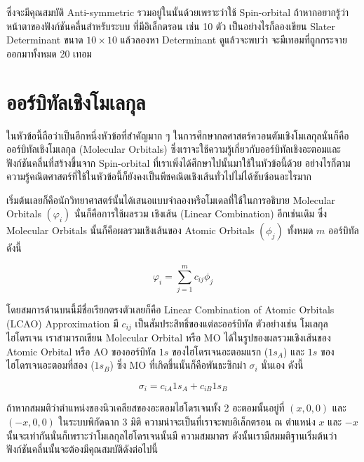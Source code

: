 \noindent ซึ่งจะมีคุณสมบัติ Anti-symmetric รวมอยู่ในนั้นด้วยเพราะว่าใช้ Spin-orbital ถ้าหากอยากรู้ว่าหน้าตาของฟังก์ชันคลื่นสำหรับระบบ%
ที่มีอิเล็กตรอน เช่น 10 ตัว เป็นอย่างไรก็ลองเขียน Slater Determinant ขนาด $10 \times 10$ แล้วลองหา Determinant ดูแล้วจะพบว่า%
จะมีเทอมที่ถูกกระจายออกมาทั้งหมด 20 เทอม

\section{ออร์บิทัลเชิงโมเลกุล}

ในหัวข้อนี้ถือว่าเป็นอีกหนึ่งหัวข้อที่สำคัญมาก ๆ ในการศึกษากลศาสตร์ควอนตัมเชิงโมเลกุลนั่นก็คือออร์บิทัลเชิงโมเลกุล (Molecular Orbitals) 
ซึ่งเราจะใช้ความรู้เกี่ยวกับออร์บิทัลเชิงอะตอมและฟังก์ชันคลื่นที่สร้างขึ้นจาก Spin-orbital ที่เราเพิ่งได้ศึกษาไปนั้นมาใช้ในหัวข้อนี้ด้วย 
อย่างไรก็ตาม ความรู้คณิตศาสตร์ที่ใช้ในหัวข้อนี้ก็ยังคงเป็นพีชคณิตเชิงเส้นทั่วไปไม่ได้ซับซ้อนอะไรมาก 

เริ่มต้นเลยก็คือนักวิทยาศาสตร์นั้นได้เสนอแบบจำลองหรือโมเดลที่ใช้ในการอธิบาย Molecular Orbitals $(\varphi_i)$ นั่นก็คือการใช้ผลรวม%
เชิงเส้น (Linear Combination) อีกเช่นเดิม ซึ่ง Molecular Orbitals นั้นก็คือผลรวมเชิงเส้นของ Atomic Orbitals $(\phi_j)$ ทั้งหมด 
$m$ ออร์บิทัล ดังนี้

\begin{equation}
    \label{eq:LCAO}
    \varphi_i = \sum_{j=1}^m c_{i j} \phi_j
\end{equation}

\noindent โดยสมการด้านบนนี้มีชื่อเรียกตรงตัวเลยก็คือ Linear Combination of Atomic Orbitals (LCAO) Approximation 
มี $c_{i j}$ เป็นสัมประสิทธิ์ของแต่ละออร์บิทัล ตัวอย่างเช่น โมเลกุลไฮโดรเจน  เราสามารถเขียน Molecular Orbital หรือ MO 
ได้ในรูปของผลรวมเชิงเส้นของ Atomic Orbital หรือ AO ของออร์บิทัล $1 s$ ของไฮโดรเจนอะตอมแรก ($1 s_A$) และ $1 s$ 
ของไฮโดรเจนอะตอมที่สอง ($1 s_B$) ซึ่ง MO ที่เกิดขึ้นนั้นก็คือพันธะซิกม่า $\sigma_i$ นั่นเอง ดังนี้

\begin{equation}
    \sigma_i = c_{i A} 1 s_A+c_{i B} 1 s_B
\end{equation}

ถ้าหากสมมติว่าตำแหน่งของนิวเคลียสของอะตอมไฮโดรเจนทั้ง 2 อะตอมนั้นอยู่ที่ $\left(x, 0,0\right)$ และ $\left(-x, 0,0\right)$ 
ในระบบพิกัดฉาก 3 มิติ ความน่าจะเป็นที่เราจะพบอิเล็กตรอน ณ ตำแหน่ง $x$ และ $-x$ นั้นจะเท่ากันนั่นก็เพราะว่าโมเลกุลไฮโดรเจนนั้นมี%
ความสมมาตร ดังนั้นเรามีสมมติฐานเริ่มต้นว่าฟังก์ชันคลื่นนั้นจะต้องมีคุณสมบัติดังต่อไปนี้ 

